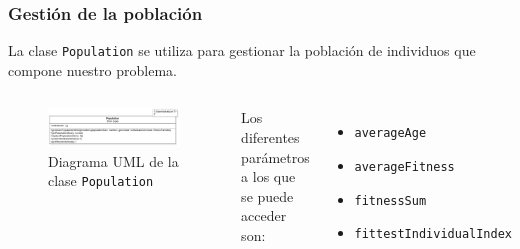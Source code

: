 \documentclass{beamer}
\begin{document}
\begin{frame}
\frametitle{Gestión de la población}

La clase \texttt{Population} se utiliza para gestionar la población de individuos que compone nuestro problema.

\bigskip

\begin{columns}
    \begin{figure}
        \centering
        \includegraphics[scale=0.2]{mem/images/cap-4/4.2.4(Population)/Population.png}
        \caption{Diagrama UML de la clase \texttt{Population}}
        \label{fig:my_label}
    \end{figure}
    Los diferentes parámetros a los que se puede acceder son:
    \begin{itemize}
        \item \texttt{averageAge}
        \item \texttt{averageFitness}
        \item \texttt{fitnessSum}
        \item \texttt{fittestIndividualIndex}
    \end{itemize}
\end{columns}

\end{frame}
\end{document}
